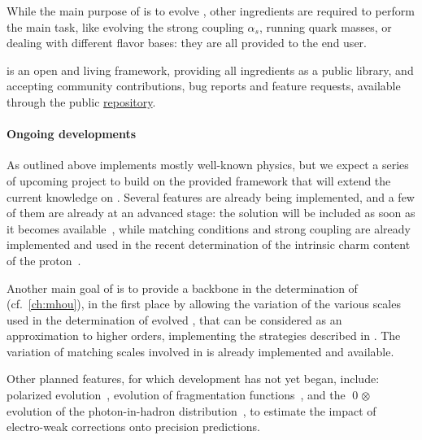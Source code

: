\renewcommand{\thefootnote}{\arabic{footnote}}

While the main purpose of \eko{} is to evolve \pdfs, other \qcd{} ingredients
are required to perform the main task, like evolving the strong coupling
$\alpha_s$, running quark masses, or dealing with different flavor bases: they
are all provided to the end user.

\eko{} is an open and living framework, providing all ingredients as a public
library, and accepting community contributions, bug reports and feature
requests, available through the public \eko{}
\href{https://github.com/N3PDF/eko/}{repository}.

\paragraph{Ongoing developments} As outlined above \eko{} implements mostly
well-known physics, but we expect a series of upcoming project to build on the
provided framework that will extend the current knowledge on \pdfs.
Several features are already being implemented, and a few of them are already
at an advanced stage: the \nnnlo{} solution will be included as soon as it
becomes available~\cite{Moch:2021qrk}, while \nnnlo{} matching conditions and
strong coupling are already implemented and used in the recent determination of
the intrinsic charm content of the proton~\cite{Ball:2022qks}.

Another main goal of \eko{} is to provide a backbone in the determination of
\mhou{} (cf.\ \cref{ch:mhou}), in the first place by allowing the variation of
the various scales used in the determination of evolved \pdfs, that can be
considered as an approximation to higher orders, implementing the strategies
described in \cite{AbdulKhalek:2019ihb}.
The variation of matching scales involved in \vfns{} is already implemented and
available.

Other planned features, for which development has not yet began, include:
polarized evolution~\cite{Vogt:2008yw,Vogt:2014pha,Blumlein:2021ryt}, evolution
of fragmentation functions~\cite{Mitov:2006ic,Moch:2007tx,Almasy:2011eq}, and
the \qed$\otimes$\qcd{} evolution of the photon-in-hadron
distribution~\cite{Bertone:2017bme,Xie:2021equ,Cridge:2021pxm}, to estimate the
impact of electro-weak corrections onto precision predictions. 
